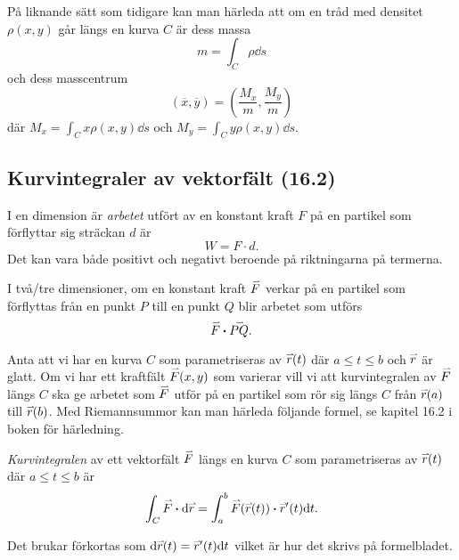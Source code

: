 \documentclass[a4paper]{article}
\begin{document}
\begin{sats}
    På liknande sätt som tidigare kan man härleda att om en tråd med densitet
    \(
        \rho(x,y)
    \) går längs en kurva \(
        C
    \) är dess massa \[
        m = \int_C \rho \dd s
    \] och dess masscentrum \[
        (\overline{x}, \overline{y}) = \left( \frac{M_x}{m}, \frac{M_y}{m} \right)
    \] där \(
        M_x = \int_C x \rho(x,y) \dd s
    \) och \(
        M_y = \int_C y \rho(x,y) \dd s
    \).
\end{sats}

\subsection{Kurvintegraler av vektorfält (16.2)}
\begin{defn}
    I en dimension är \emph{arbetet} utfört av en konstant kraft \(
        F
    \) på en partikel som förflyttar sig sträckan \(
        d
    \) är \[
        W = F \cdot d.
    \] Det kan vara både positivt och negativt beroende på riktningarna på termerna.

    I två/tre dimensioner, om en konstant kraft \(
        \accentset{\rightharpoonup}{F} 
    \) verkar på en partikel som förflyttas från en punkt \(
        P
    \) till en punkt \(
        Q
    \) blir arbetet som utförs \[
        \accentset{\rightharpoonup}{F} \boldsymbol{\cdot} \accentset{\rightharpoonup}{PQ}. 
    \] 
\end{defn}

Anta att vi har en kurva \(
    C
\) som parametriseras av \(
    \accentset{\rightharpoonup}{r}(t)
\) där \(
    a \leq t \leq b
\) och \(
    \accentset{\rightharpoonup}{r}
\) är glatt. Om vi har ett kraftfält \(
    \accentset{\rightharpoonup}{F} (x,y)
\) som varierar vill vi att kurvintegralen av \(
    \accentset{\rightharpoonup}{F} 
\) längs \(
    C
\) ska ge arbetet som \(
    \accentset{\rightharpoonup}{F} 
\) utför på en partikel som rör sig längs \(
    C
\) från \(
    \accentset{\rightharpoonup}{r}(a)
\) till \(
    \accentset{\rightharpoonup}{r}(b)
\). Med Riemannsummor kan man härleda följande formel, se kapitel 16.2 i boken 
för härledning.

\begin{defn}
    \emph{Kurvintegralen} av ett vektorfält \(
        \accentset{\rightharpoonup}{F} 
    \) längs en kurva \(
        C
    \) som parametriseras av \(
        \accentset{\rightharpoonup}{r}(t)
    \) där \(
        a \leq t \leq b
    \) är \[
        \int_C \accentset{\rightharpoonup}{F} \boldsymbol{\cdot} \dd \accentset{\rightharpoonup}{r} 
            = \int_a^b \accentset{\rightharpoonup}{F} (\accentset{\rightharpoonup}{r}(t)) \boldsymbol{\cdot} \accentset{\rightharpoonup}{r}'(t) \dd t. 
    \] 

    Det brukar förkortas som \(
        \dd \accentset{\rightharpoonup}{r}(t) = \accentset{\rightharpoonup}{r}'(t) \dd t
    \) vilket är hur det skrivs på formelbladet.
\end{defn}
\end{document}
